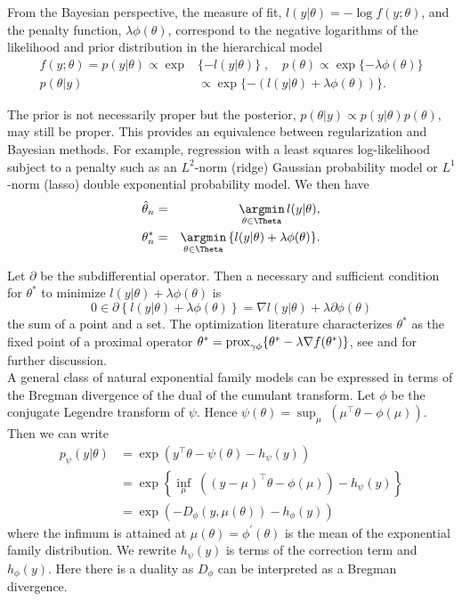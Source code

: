 \documentclass[12pt]{TD-CJS}
\begin{document}
From the Bayesian perspective, the measure of fit, $l(y|\theta) = - \log f(y; \theta)$, and the penalty function, $\lambda\phi(\theta)$, correspond to the negative logarithms of the likelihood and prior distribution in the hierarchical model
\begin{align*}
f(y; \theta) = p(y | \theta) \propto \exp & \{-  l(y|\theta)\} \; , \quad p(\theta) \propto \exp\{ - \lambda\phi(\theta) \} \\
p( \theta | y ) &  \propto \exp\{- ( l(y|\theta) + \lambda\phi(\theta) ) \}.
\end{align*}


\noindent The prior is not necessarily proper but the posterior, $p(\theta | y) \propto p(y | \theta) p(\theta)$, may still be proper. This provides an equivalence between regularization and Bayesian methods. For example, regression with a least squares log-likelihood subject to a penalty such as an $L^2$-norm (ridge) Gaussian probability model or $ L^1$-norm (lasso) double exponential probability model. We then have
\begin{eqnarray}
&\hat\theta_n =& \underset{\theta \in \Theta}{\argmin}\, l(y|\theta),\\
&\theta^*_n =& \underset{\theta \in \Theta}{\argmin}\,  \{ l(y|\theta) + \lambda\phi(\theta) \}.  \label{posterior mode}
\end{eqnarray}

\noindent Let $\partial$ be the subdifferential operator.  Then a necessary and sufficient condition for $\theta^*$ to minimize $ l(y|\theta) + \lambda\phi(\theta)$  is 
\begin{equation}
\label{eqn:subdiffproxgrad}
0 \in \partial \left\{ l(y|\theta) + \lambda\phi(\theta)\right\} = \nabla l(y|\theta) + \lambda\partial \phi(\theta) 
\end{equation}
the sum of a point and a set.  The optimization literature  characterizes $\theta^*$ as the fixed point of a proximal operator
$\theta^* = \mathop{\mathrm{prox}}_{\gamma \phi}\{ \theta^* - \lambda \nabla f(\theta^*) \} $, see \cite{polson2015mixtures} and \cite*{polson2015proximal} for further discussion. \\

\noindent A general class of natural exponential family models can be expressed in terms of the Bregman divergence of the dual of the cumulant transform.
Let $ \phi $ be the conjugate Legendre transform of $\psi$. Hence $ \psi(\theta) = \sup_\mu \; \left ( \mu^\top \theta - \phi(\mu) \right )$. Then we can write
\begin{align*}
p_\psi ( y | \theta ) & = \exp \left ( y^\top \theta - \psi( \theta) - h_\psi(y) \right )\\
 & = \exp \left \{ \inf_\mu \; \left ( ( y - \mu )^\top \theta - \phi(\mu) \right ) - h_\psi(y) \right \}\\
& = \exp \left ( - D_\phi ( y , \mu(\theta) ) - h_\phi (y) \right )
\end{align*}
where the infimum is attained at $ \mu(\theta) = \phi^\prime (\theta) $ is the mean of the exponential family distribution. 
We rewrite $ h_\psi(y) $ is terms of the correction term and $ h_\phi(y)$. Here there is a duality as $D_\phi$ can be interpreted as a Bregman divergence. \\
\end{document}
